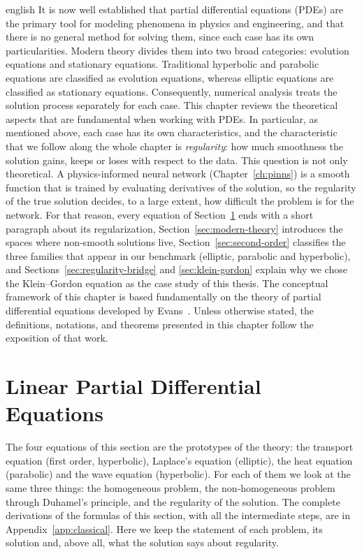 \documentclass[12pt,letterpaper,twoside]{book}
\begin{document}
\begin{hyphenrules}{english}
It is now well established that partial differential equations (PDEs) are the primary tool for
modeling phenomena in physics and engineering, and that there is no general method for solving them,
since each case has its own particularities. Modern theory divides them into two broad categories:
evolution equations and stationary equations. Traditional hyperbolic and parabolic equations are
classified as evolution equations, whereas elliptic equations are classified as stationary equations.
Consequently, numerical analysis treats the solution process separately for each case.
This chapter reviews the theoretical aspects that are fundamental when working with PDEs. In
particular, as mentioned above, each case has its own characteristics, and the characteristic that we
follow along the whole chapter is \emph{regularity}: how much smoothness the solution gains, keeps or
loses with respect to the data. This question is not only theoretical. A physics-informed neural
network (Chapter~\ref{ch:pinns}) is a smooth function that is trained by evaluating derivatives of the
solution, so the regularity of the true solution decides, to a large extent, how difficult the problem
is for the network. For that reason, every equation of Section~\ref{sec:linear-pdes} ends with a short
paragraph about its regularization, Section~\ref{sec:modern-theory} introduces the spaces where non-smooth
solutions live, Section~\ref{sec:second-order} classifies the three families that appear in our benchmark
(elliptic, parabolic and hyperbolic), and Sections~\ref{sec:regularity-bridge} and \ref{sec:klein-gordon} explain why we
chose the Klein--Gordon equation as the case study of this thesis.
The conceptual framework of this chapter is based fundamentally on the theory of partial differential
equations developed by Evans~\cite{evans2010}. Unless otherwise stated, the definitions, notations, and
theorems presented in this chapter follow the exposition of that work.

\section{Linear Partial Differential Equations}\label{sec:linear-pdes}

The four equations of this section are the prototypes of the theory: the transport equation (first
order, hyperbolic), Laplace's equation (elliptic), the heat equation (parabolic) and the wave equation
(hyperbolic). For each of them we look at the same three things: the homogeneous problem, the
non-homogeneous problem through Duhamel's principle, and the regularity of the solution.
The complete derivations of the formulas of this section, with all the intermediate steps, are in
Appendix~\ref{app:classical}. Here we keep the statement of each problem, its solution and, above all,
what the solution says about regularity.


\end{hyphenrules}
\end{document}
